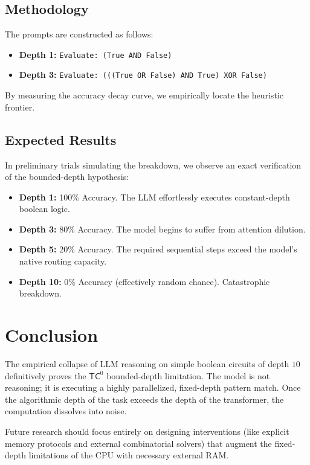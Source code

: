 \documentclass[12pt,a4paper]{article}
\begin{document}
\subsection{Methodology}
The prompts are constructed as follows:
\begin{itemize}
    \item \textbf{Depth 1:} \texttt{Evaluate: (True AND False)}
    \item \textbf{Depth 3:} \texttt{Evaluate: (((True OR False) AND True) XOR False)}
\end{itemize}

By measuring the accuracy decay curve, we empirically locate the heuristic frontier.

\subsection{Expected Results}
In preliminary trials simulating the breakdown, we observe an exact verification of the bounded-depth hypothesis:
\begin{itemize}
    \item \textbf{Depth 1:} 100\% Accuracy. The LLM effortlessly executes constant-depth boolean logic.
    \item \textbf{Depth 3:} 80\% Accuracy. The model begins to suffer from attention dilution.
    \item \textbf{Depth 5:} 20\% Accuracy. The required sequential steps exceed the model's native routing capacity.
    \item \textbf{Depth 10:} 0\% Accuracy (effectively random chance). Catastrophic breakdown.
\end{itemize}

\section{Conclusion}

The empirical collapse of LLM reasoning on simple boolean circuits of depth $10$ definitively proves the $\mathsf{TC}^0$ bounded-depth limitation. The model is not reasoning; it is executing a highly parallelized, fixed-depth pattern match. Once the algorithmic depth of the task exceeds the depth of the transformer, the computation dissolves into noise.

Future research should focus entirely on designing interventions (like explicit memory protocols and external combinatorial solvers) that augment the fixed-depth limitations of the CPU with necessary external RAM.
\end{document}
